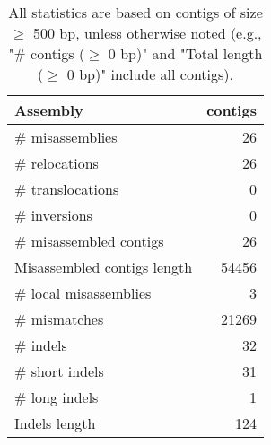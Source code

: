 \documentclass[12pt,a4paper]{article}
\begin{document}
\begin{table}[ht]
\begin{center}
\caption{All statistics are based on contigs of size $\geq$ 500 bp, unless otherwise noted (e.g., "\# contigs ($\geq$ 0 bp)" and "Total length ($\geq$ 0 bp)" include all contigs).}
\begin{tabular}{|l*{1}{|r}|}
\hline
Assembly & contigs \\ \hline
\# misassemblies & 26 \\ \hline
\hspace{5mm}\# relocations & 26 \\ \hline
\hspace{5mm}\# translocations & 0 \\ \hline
\hspace{5mm}\# inversions & 0 \\ \hline
\# misassembled contigs & 26 \\ \hline
Misassembled contigs length & 54456 \\ \hline
\# local misassemblies & 3 \\ \hline
\# mismatches & 21269 \\ \hline
\# indels & 32 \\ \hline
\hspace{5mm}\# short indels & 31 \\ \hline
\hspace{5mm}\# long indels & 1 \\ \hline
Indels length & 124 \\ \hline
\end{tabular}
\end{center}
\end{table}
\end{document}
